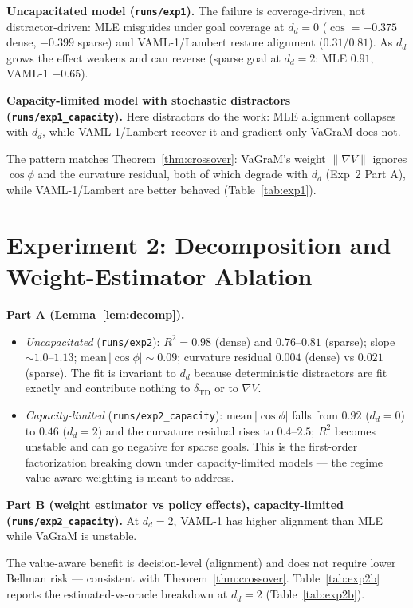 \documentclass{article}
\theoremstyle{plain}
\begin{document}
\textbf{Uncapacitated model (\texttt{runs/exp1}).} The failure is coverage-driven, not
distractor-driven: MLE misguides under goal coverage at $d_d = 0$
($\cos = -0.375$ dense, $-0.399$ sparse) and VAML-1/Lambert restore alignment
($0.31$/$0.81$). As $d_d$ grows the effect weakens and can reverse (sparse goal at
$d_d = 2$: MLE $0.91$, VAML-1 $-0.65$).

\textbf{Capacity-limited model with stochastic distractors (\texttt{runs/exp1\_capacity}).}
Here distractors do the work: MLE alignment collapses with $d_d$, while VAML-1/Lambert
recover it and gradient-only VaGraM does not.

The pattern matches Theorem~\ref{thm:crossover}: VaGraM's weight
$\lVert \nabla V\rVert$ ignores $\cos\phi$ and the curvature residual, both of which
degrade with $d_d$ (Exp~2 Part A), while VAML-1/Lambert are better behaved
(Table~\ref{tab:exp1}).



\section{Experiment 2: Decomposition and Weight-Estimator Ablation}

\textbf{Part A (Lemma~\ref{lem:decomp}).}
\begin{itemize}
\item \emph{Uncapacitated} (\texttt{runs/exp2}): $R^2 = 0.98$ (dense) and $0.76$--$0.81$
  (sparse); slope $\sim 1.0$--$1.13$; $\mathrm{mean}\,\lvert\cos\phi\rvert \sim 0.09$;
  curvature residual $0.004$ (dense) vs $0.021$ (sparse). The fit is invariant to $d_d$
  because deterministic distractors are fit exactly and contribute nothing to
  $\delta_{\mathrm{TD}}$ or to $\nabla V$.
\item \emph{Capacity-limited} (\texttt{runs/exp2\_capacity}):
  $\mathrm{mean}\,\lvert\cos\phi\rvert$ falls from $0.92$ ($d_d = 0$) to $0.46$
  ($d_d = 2$) and the curvature residual rises to $0.4$--$2.5$; $R^2$ becomes unstable
  and can go negative for sparse goals. This is the first-order factorization breaking
  down under capacity-limited models --- the regime value-aware weighting is meant to
  address.
\end{itemize}

\textbf{Part B (weight estimator vs policy effects), capacity-limited
(\texttt{runs/exp2\_capacity}).} At $d_d = 2$, VAML-1 has higher alignment than MLE
while VaGraM is unstable.

The value-aware benefit is decision-level (alignment) and does not require lower
Bellman risk --- consistent with Theorem~\ref{thm:crossover}. Table~\ref{tab:exp2b}
reports the estimated-vs-oracle breakdown at $d_d = 2$ (Table~\ref{tab:exp2b}).
\end{document}
